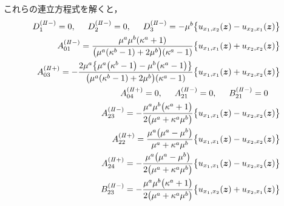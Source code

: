 これらの連立方程式を解くと，
\begin{align}
	D_{1}^{(I\hspace{-.15em}I-)}=0,\hspace{0.5cm}D_{2}^{(I\hspace{-.15em}I-)}=0,
	\hspace{0.5cm}D_{3}^{(I\hspace{-.15em}I-)}=-\mu^{b}\bigl\{u_{x_{1},x_{2}}(\bm{z})-u_{x_{2},x_{1}}(\bm{z})\bigr\}&
	\nonumber
	\\
	A_{01}^{(I\hspace{-.15em}I-)}=\frac{\mu^{a}\mu^{b}(\kappa^{a}+1)}{\bigl(\mu^{a}(\kappa^{b}-1)+2\mu^{b}\bigr)(\kappa^{a}-1)}
	\bigl\{u_{x_{1},x_{1}}(\bm{z})+u_{x_{2},x_{2}}(\bm{z})\bigr\}&
	\nonumber
	\\
	A_{03}^{(I\hspace{-.15em}I+)}=-\frac{2\mu^{a}\bigl\{ \mu^{a}\bigl(\kappa^{b}-1\bigr)-\mu^{b}\bigl(\kappa^{a}-1\bigr)\bigr\}}{\bigl(\mu^{a}(\kappa^{b}-1)+2\mu^{b}\bigr)(\kappa^{a}-1)}
	\bigl\{u_{x_{1},x_{1}}(\bm{z})+u_{x_{2},x_{2}}(\bm{z})\bigr\}&
	\nonumber
	\\
	A_{04}^{(I\hspace{-.15em}I+)}=0,\hspace{0.5cm} A_{21}^{(I\hspace{-.15em}I-)}=0,\hspace{0.5cm} B_{21}^{(I\hspace{-.15em}I-)}=0\hspace{0.5cm}&
	\nonumber
	\\
	A_{23}^{(I\hspace{-.15em}I-)}=-\frac{\mu^{a}\mu^{b}\bigl(\kappa^{a}+1\bigr)}{2\bigl(\mu^{a}+\kappa^{a}\mu^{b}\bigr)}
	\bigl\{u_{x_{1},x_{1}}(\bm{z})-u_{x_{2},x_{2}}(\bm{z})\bigr\}&
	\nonumber
	\\
	A_{22}^{(I\hspace{-.15em}I+)}=\frac{\mu^{a}\bigl(\mu^{a}-\mu^{b}\bigr)}{\mu^{a}+\kappa^{a}\mu^{b}}
	\bigl\{u_{x_{1},x_{1}}(\bm{z})-u_{x_{2},x_{2}}(\bm{z})\bigr\}&
	\nonumber\\
	A_{24}^{(I\hspace{-.15em}I+)}=-\frac{\mu^{a}\bigl(\mu^{a}-\mu^{b}\bigr)}{2\bigl(\mu^{a}+\kappa^{a}\mu^{b}\bigr)}
	\bigl\{u_{x_{1},x_{1}}(\bm{z})-u_{x_{2},x_{2}}(\bm{z})\bigr\}&
	\nonumber
	\\
	B_{23}^{(I\hspace{-.15em}I-)}=-\frac{\mu^{a}\mu^{b}\bigl(\kappa^{a}+1\bigr)}{2\bigl(\mu^{a}+\kappa^{a}\mu^{b}\bigr)}
	\bigl\{u_{x_{1},x_{2}}(\bm{z})+u_{x_{2},x_{1}}(\bm{z})\bigr\}&

\end{align}
